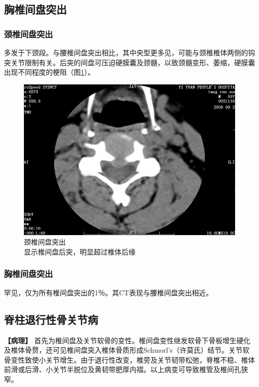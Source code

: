\subsection{胸椎间盘突出}

\subsubsection{颈椎间盘突出}

多发于下颈段。与腰椎间盘突出相比，其中央型更多见，可能与颈椎椎体两侧的钩突关节限制有关。后突的间盘可压迫硬膜囊及颈髓，以致颈髓变形、萎缩，硬膜囊出现不同程度的梗阻（图\ref{fig23-9}）。

\begin{figure}[!htbp]
 \centering
 \includegraphics[width=.7\textwidth,height=\textheight,keepaspectratio]{./images/Image00472.jpg}
 \captionsetup{justification=centering}
 \caption{颈椎间盘突出\\{\small 显示椎间盘后突，明显超过椎体后缘}}
 \label{fig23-9}
  \end{figure} 

\subsubsection{胸椎间盘突出}

罕见，仅为所有椎间盘突出的1％。其CT表现与腰椎间盘突出相近。

\subsection{脊柱退行性骨关节病}

\textbf{【病理】}
首先为椎间盘及关节软骨的变性。椎间盘变性继发软骨下骨板增生硬化及椎体骨赘，还可见椎间盘突入椎体骨质形成Schmorl's（许莫氏）结节。关节软骨变性致使小关节增生。由于退行性改变，椎旁及关节韧带松弛，脊椎不稳、椎体前滑或后滑、小关节半脱位及黄韧带肥厚内褶。以上病变可导致椎管及椎间孔狭窄。


